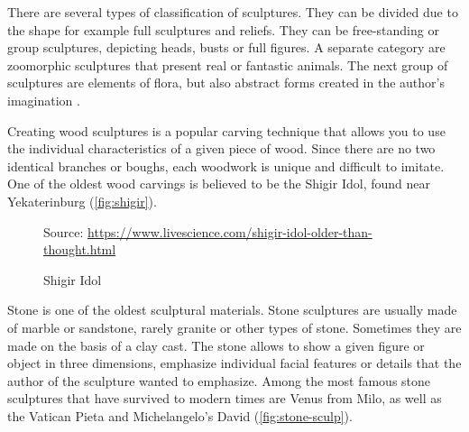 \documentclass{report}
\begin{document}
There are several types of classification of sculptures. They can be divided due to the shape for example full sculptures and reliefs. They can be free-standing or group sculptures, depicting heads, busts or full figures. A separate category are zoomorphic sculptures that present real or fantastic animals. The next group of sculptures are elements of flora, but also abstract forms created in the author's imagination \cite{BOOK:4}.

Creating wood sculptures is a popular carving technique that allows you to use the individual characteristics of a given piece of wood. Since there are no two identical branches or boughs, each woodwork is unique and difficult to imitate. One of the oldest wood carvings is believed to be the Shigir Idol, found near Yekaterinburg (\autoref{fig:shigir}).

\begin{figure}[h]
\center
{} {Source: \url{https://www.livescience.com/shigir-idol-older-than-thought.html}}
\caption{Shigir Idol}
\label{fig:shigir}
\end{figure}

Stone is one of the oldest sculptural materials. Stone sculptures are usually made of marble or sandstone, rarely granite or other types of stone. Sometimes they are made on the basis of a clay cast. The stone allows to show a given figure or object in three dimensions, emphasize individual facial features or details that the author of the sculpture wanted to emphasize. Among the most famous stone sculptures that have survived to modern times are Venus from Milo, as well as the Vatican Pieta and Michelangelo's David (\autoref{fig:stone-sculp}).
\end{document}
